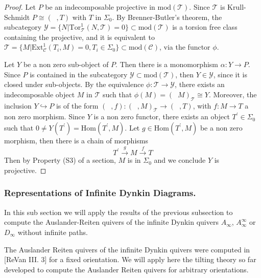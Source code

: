 \documentclass{amsart}
\theoremstyle{plain}
\numberwithin{equation}{section}
\begin{document}
\begin{proof}
Let $P$ be an indecomposable projective in $\mathrm{mod}(\mathcal{T})$.
Since $\mathcal{T}$ is Krull-Schmidt $P\cong (\;\;,T)$ with $T$ in $\Sigma
_{0}$. By Brenner-Butler's theorem, the subcategory $\mathscr Y=\{N|\mathrm{Tor}_{\mathcal{T}}^{1}(N,\mathcal{T})=0\}\subset \mathrm{mod}(\mathcal{T})$
is a torsion free class containing the projective, and it is equivalent to $\mathscr T=\{M|\mathrm{Ext}_{\mathcal{C}}^{1}(T_{i},M)=0,T_{i}\in \Sigma
_{0}\}\subset \mathrm{mod}(\mathcal{C})$, via the functor $\phi $.

Let $Y$ be a non zero sub-object of $P$. Then there is a monomorphism $\alpha :Y\rightarrow P$. Since $P$ is contained in the subcategory $\mathscr Y\subset \mathrm{mod}(\mathcal{T})$, then $Y\in \mathscr Y$, since it is
closed under sub-objects. By the equivalence $\phi :\mathscr T\rightarrow \mathscr Y$, there exists an indecomposable object $M$ in $\mathscr T$ such
that $\phi (M)=(\;\;M)_{\mathcal{T}}\cong Y$. Moreover, the inclusion $Y\hookrightarrow P$ is of the form $(\;\;,f):(\;\;,M)_{\mathcal{T}}\rightarrow (\;\;,T)$, with $f:M\rightarrow T$ a non zero morphism. Since $Y $ is a non zero functor, there exists an object $T^{\prime }\in \Sigma
_{0} $ such that $0\neq Y(T^{\prime })=\mathrm{Hom}(T^{\prime },M)$. Let $g\in \mathrm{Hom}(T^{\prime },M)$ be a non zero morphism, then there is a
chain of morphisms
\begin{equation*}
T^{\prime }\xrightarrow{g}M\xrightarrow{f}T
\end{equation*}Then by Property (S3) of a section, $M$ is in $\Sigma _{0}$ and we conclude $Y$ is projective.
\end{proof}

\subsubsection{Representations of Infinite Dynkin Diagrams.}

\bigskip In this sub section we will apply the results of the previous subsection
 to compute the Auslander-Reiten quivers of the infinite Dynkin
quivers $A_{\infty }$, $A_{\infty }^{\infty }$ or $D_{\infty }$ without
infinite paths. 

The Auslander Reiten quivers of the infinite Dynkin quivers  were computed
in [ReVan III. 3]  for a fixed orientation. We will apply here the tilting
theory so far developed to compute the Auslander Reiten quivers for
arbitrary orientations.
\end{document}
